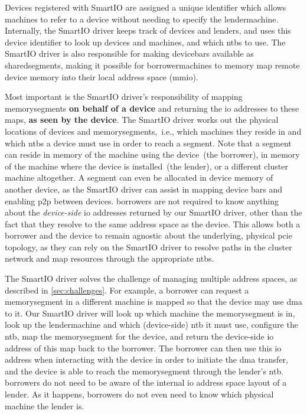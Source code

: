 Devices registered with SmartIO are assigned a unique identifier which allows machines to refer to a device without needing to specify the \gls{lendermachine}.
%
Internally, the SmartIO driver keeps track of devices and \glspl{lender}, and uses this device identifier to look up devices and machines, and which \glspl{ntb} to use.
%
The SmartIO driver is also responsible for making \glspl{devicebar} available as \glspl{sharedsegment}, making it possible for \glspl{borrowermachine} to memory map remote device memory into their local address space (\gls{mmio}).



Most important is the SmartIO driver's responsibility of mapping \glspl{memorysegment} \textbf{on behalf of a device} and returning the \gls{io} addresses to these maps, \textbf{as seen by the device}.
%
The SmartIO driver works out the physical locations of devices and \glspl{memorysegment},~i.e., which machines they reside in and which \glspl{ntb} a device must use in order to reach a \gls{segment}.
%
Note that a \gls{segment} can reside in memory of the machine using the device~(the \gls{borrower}), in memory of the machine where the device is installed~(the \gls{lender}), or a different cluster machine altogether.
%
A segment can even be allocated in device memory of another device, as the SmartIO driver can assist in mapping device \glspl{bar} and enabling \gls{p2p} between devices.
%
\Glspl{borrower} are not required to know anything about the \emph{device-side} \gls{io} addresses returned by our SmartIO driver, other than the fact that they resolve to the same address space as the device.
%
This allows both a \gls{borrower} and the device to remain agnostic about the underlying, physical \gls{pcie} topology, as they can rely on the SmartIO driver to resolve paths in the cluster network and map resources through the appropriate \glspl{ntb}.



The SmartIO driver solves the challenge of managing multiple address spaces, as described in \cref{sec:challenges}.
%
For example, a \gls{borrower} can request a \gls{memorysegment} in a different machine is mapped so that the device may use \gls{dma} to it.
%
Our SmartIO driver will look up which machine the \gls{memorysegment} is in, look up the \gls{lendermachine} and which (device-side) \gls{ntb} it must use, configure the \gls{ntb}, map the \gls{memorysegment} for the device, and return the device-side \gls{io} address of this map back to the \gls{borrower}.
%
The \gls{borrower} can then use this \gls{io} address when interacting with the device in order to initiate the \gls{dma} transfer, and the device is able to reach the \gls{memorysegment} through the lender's \gls{ntb}.
%
\Glspl{borrower} do not need to be aware of the internal \gls{io} address space layout of a \gls{lender}.
%
As it happens, \glspl{borrower} do not even need to know which physical machine the \gls{lender} is.



